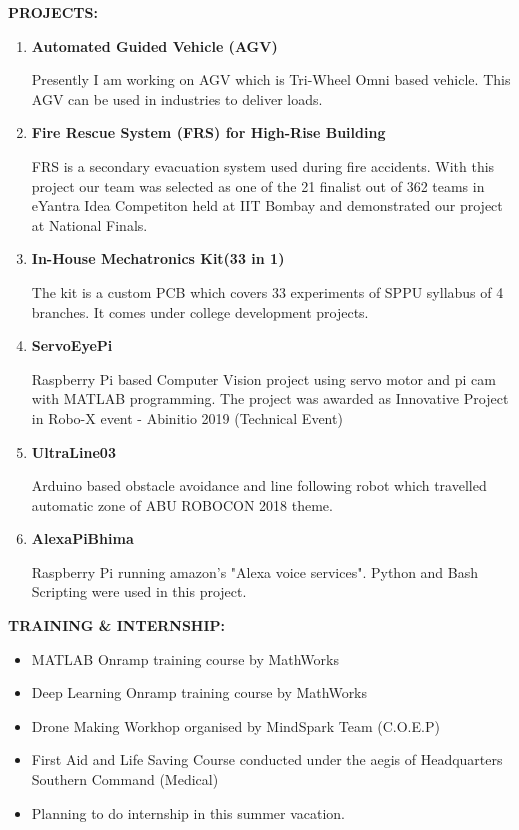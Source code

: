 \documentclass[a4paper, 10pt]{article}
\begin{document}
{\textbf{\Large{PROJECTS:}}}
\begin{enumerate}
\item {\textbf{\large{Automated Guided Vehicle (AGV)}}}

Presently I am working on AGV which is Tri-Wheel Omni based vehicle$.$ This AGV can be used in industries to deliver loads.
\item {\textbf{\large{Fire Rescue System (FRS) for High-Rise Building}}}

FRS is a secondary evacuation system used during fire accidents$.$ With this project our team was selected as one of the 21 finalist out of 362 teams in eYantra Idea Competiton held at IIT Bombay and demonstrated our project at National Finals.
\item {\textbf{\large{In-House Mechatronics Kit(33 in 1)}}}

The kit is a custom PCB which covers 33 experiments of SPPU syllabus of 4 branches. It comes under college development projects.
\item {\textbf{\large{ServoEyePi}}}

Raspberry Pi based Computer Vision project using servo motor and pi cam with MATLAB programming. The project was awarded as Innovative Project in Robo-X event - Abinitio 2019 (Technical Event)
\item {\textbf{\large{UltraLine03}}}

Arduino based obstacle avoidance and line following robot which travelled automatic zone of ABU ROBOCON 2018 theme.
\item {\textbf{\large{AlexaPiBhima}}}

Raspberry Pi running amazon's "Alexa voice services"$.$ Python and Bash Scripting were used in this project.
\end{enumerate}

{\textbf{\Large{TRAINING \& INTERNSHIP:}}}
\begin{itemize}
\item MATLAB Onramp training course by MathWorks
\item Deep Learning Onramp training course by MathWorks
\item Drone Making Workhop organised by MindSpark Team (C.O.E.P)
\item First Aid and Life Saving Course conducted under the aegis of Headquarters Southern Command (Medical)
\item Planning to do internship in this summer vacation.\\
\end{itemize}
\end{document}

